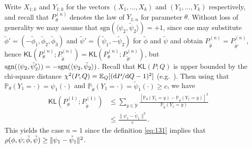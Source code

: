 \documentclass[journal]{IEEEtran}
\newcommand{\sgn}{\mathrm{sgn}}
\newcommand{\1}{\boldsymbol{1}}
\newcommand{\EE}{\mathbb{E}}
\newcommand{\PP}{\mathbb{P}}
\newcommand{\KL}{\mathsf{KL}}
\DeclarePairedDelimiter{\ip}{\langle}{\rangle}
\DeclarePairedDelimiter{\norm}{\lVert}{\rVert}
\begin{document}
Write $X_{1:k}$ and $Y_{1:k}$ for the vectors $(X_1,\dots, X_k)$ and $(Y_1,\dots,Y_k)$ respectively, and recall that $P_\theta^{(n)}$ denotes the law of $Y_{1:n}$ for parameter $\theta$. Without loss of generality we may assume that $\sgn(\langle \psi_2,\tilde{\psi}_2 \rangle) = +1$, %
since one may substitute  $\tilde{\phi}' = (-\tilde{\phi}_1,\tilde{\phi}_2,\tilde{\phi}_3)$ and $\tilde{\psi}' = (\tilde{\psi}_1,-\tilde{\psi}_2)$ for $\tilde{\phi}$ and $\tilde{\psi}$ and obtain $P_{\tilde{\theta}}^{(n)} = P_{\tilde{\theta'}}^{(n)}$, hence $\KL(P_{\theta}^{(n)}; P_{\tilde{\theta}}^{(n)}) = \KL(P_{\theta}^{(n)}; P_{\tilde{\theta}'}^{(n)})$, but $\sgn(\ip{ \psi_2, \tilde{\psi}_2'}) = - \sgn(\ip{\psi_2,\tilde{\psi}_2})$.
 Recall that
  $\KL(P;Q)$ is upper bounded by the chi-square distance
  $\chi^2(P,Q)=\EE_Q[(\intd P/ \intd Q -1)^2]$ (e.g.\ \cite[Lemma
  2.7]{tsybakov:2009}). Then using that
  $\PP_{\theta}(Y_1 = \cdot) = \psi_1(\cdot)$ and
  $\PP_{\tilde{\theta}}(Y_1 = \cdot) = \tilde{\psi}_1(\cdot) \geq c$, we have
  \begin{align}
	\KL(P_{\theta}^{(1)};P_{\tilde{\theta}}^{(1)})
    &\leq \sum_{y \in \mathcal{Y}} \frac{[\PP_{\theta}(Y_1 = y) - \PP_{\tilde{\theta}}(Y_1 = y)  ]^2}{\PP_{\tilde{\theta}}(Y_1 = y)}\nonumber\\%
    \label{eq:kl:29}
    &\leq \frac{\|\psi_1 - \tilde{\psi}_1\|^2}{c}.
  \end{align}
  This yields the case $n=1$ since the definition \eqref{eq:131} implies that $\rho(\phi,\psi;\tilde{\phi},\tilde{\psi})\geq \norm{\psi_1-\tilde{\psi}_1}^2$.
\end{document}
